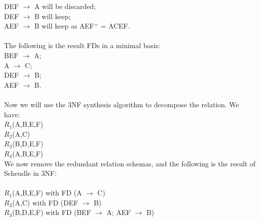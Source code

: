 \documentclass[12pt]{article}
\begin{document}
DEF $\rightarrow$ A will be discarded; \\
DEF $\rightarrow$ B will keep;\\
AEF $\rightarrow$ B will keep as AEF$^+$ = ACEF.\\ \\
The following is the result FDs in a minimal basis:\\
BEF $\rightarrow$ A;\\
A $\rightarrow$ C;\\
DEF $\rightarrow$ B;\\
AEF $\rightarrow$ B.\\
\\
Now we will use the 3NF synthesis algorithm to decompose the relation. We have:\\
$R_1$(A,B,E,F) \\
$R_2$(A,C) \\
$R_3$(B,D,E,F) \\ 
$R_4$(A,B,E,F) \\ 
We now remove the redundant relation schemas, and the following is the result of Scheudle in 3NF:\\ \\ 
$R_1$(A,B,E,F) with FD (A $\rightarrow$ C) \\
$R_2$(A,C) with FD (DEF $\rightarrow$ B)\\
$R_3$(B,D,E,F) with FD (BEF $\rightarrow$ A; AEF $\rightarrow$ B) \\ 
 
\end{document}
